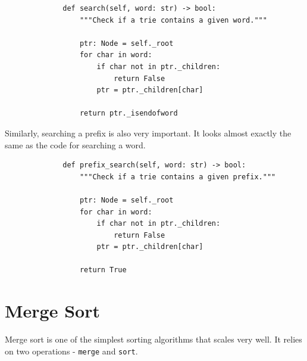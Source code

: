 \documentclass[11pt]{article}
\begin{document}
\begin{figure}[H]
    \centering
    \begin{verbatim}
        def search(self, word: str) -> bool:
            """Check if a trie contains a given word."""

            ptr: Node = self._root
            for char in word:
                if char not in ptr._children:
                    return False
                ptr = ptr._children[char]

            return ptr._isendofword
    \end{verbatim}
\end{figure}

Similarly, searching a prefix is also very important. It looks almost exactly
the same as the code for searching a word.

\begin{figure}[H]
    \centering
    \begin{verbatim}
        def prefix_search(self, word: str) -> bool:
            """Check if a trie contains a given prefix."""

            ptr: Node = self._root
            for char in word:
                if char not in ptr._children:
                    return False
                ptr = ptr._children[char]

            return True
    \end{verbatim}
\end{figure}


\newpage

\section{Merge Sort}

Merge sort is one of the simplest sorting algorithms that scales very well. It
relies on two operations - \texttt{merge} and
\texttt{sort}.
\end{document}
